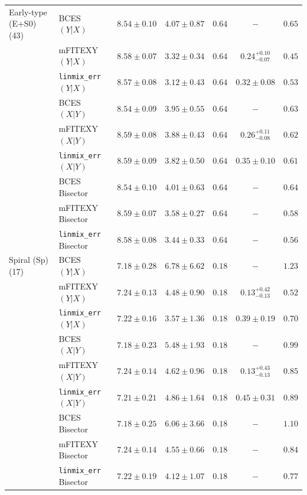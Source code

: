 \documentclass[preprint2]{emulateapj}
\begin{document}
\begin{table}
\begin{tabular}{llccccc}
 Early-type (E+S0) (43)	& BCES $(Y|X)$  	     & $8.54 \pm 0.10$ & $4.07 \pm 0.87$ & $0.64$ & $-$ & $0.65$ \\
 			& mFITEXY $(Y|X)$	     & $8.58 \pm 0.07$ & $3.32 \pm 0.34$ & $0.64$ & $0.24^{+0.10}_{-0.07}$ & $0.45$ \\
 			& {\tt linmix\_err} $(Y|X)$  & $8.57 \pm 0.08$ & $3.12 \pm 0.43$ & $0.64$ & $0.32 \pm 0.08$ & $0.53$ \\ [0.5em]
 			& BCES $(X|Y)$  	     & $8.54 \pm 0.09$ & $3.95 \pm 0.55$ & $0.64$ & $-$ & $0.63$ \\
 			& mFITEXY $(X|Y)$	     & $8.59 \pm 0.08$ & $3.88 \pm 0.43$ & $0.64$ & $0.26^{+0.11}_{-0.08}$ & $0.62$ \\
 			& {\tt linmix\_err} $(X|Y)$  & $8.59 \pm 0.09$ & $3.82 \pm 0.50$ & $0.64$ & $0.35 \pm 0.10$ & $0.61$ \\ [0.5em]
 			& BCES Bisector 	     & $8.54 \pm 0.10$ & $4.01 \pm 0.63$ & $0.64$ & $-$ & $0.64$ \\
 			& mFITEXY Bisector	     & $8.59 \pm 0.07$ & $3.58 \pm 0.27$ & $0.64$ & $-$ & $0.58$ \\
 			& {\tt linmix\_err} Bisector & $8.58 \pm 0.08$ & $3.44 \pm 0.33$ & $0.64$ & $-$ & $0.56$ \\ [0.5em]

 Spiral (Sp) (17)	& BCES $(Y|X)$  	     & $7.18 \pm 0.28$ & $6.78 \pm 6.62$ & $0.18$ & $-$ & $1.23$ \\
 			& mFITEXY $(Y|X)$	     & $7.24 \pm 0.13$ & $4.48 \pm 0.90$ & $0.18$ & $0.13^{+0.42}_{-0.13}$ & $0.52$ \\
 			& {\tt linmix\_err} $(Y|X)$  & $7.22 \pm 0.16$ & $3.57 \pm 1.36$ & $0.18$ & $0.39 \pm 0.19$ & $0.70$ \\ [0.5em]
 			& BCES $(X|Y)$  	     & $7.18 \pm 0.23$ & $5.48 \pm 1.93$ & $0.18$ & $-$ & $0.99$ \\
 			& mFITEXY $(X|Y)$	     & $7.24 \pm 0.14$ & $4.62 \pm 0.96$ & $0.18$ & $0.13^{+0.43}_{-0.13}$ & $0.85$ \\
 			& {\tt linmix\_err} $(X|Y)$  & $7.21 \pm 0.21$ & $4.86 \pm 1.64$ & $0.18$ & $0.45 \pm 0.31$ & $0.89$ \\ [0.5em]
 			& BCES Bisector 	     & $7.18 \pm 0.25$ & $6.06 \pm 3.66$ & $0.18$ & $-$ & $1.10$ \\
 			& mFITEXY Bisector	     & $7.24 \pm 0.14$ & $4.55 \pm 0.66$ & $0.18$ & $-$ & $0.84$ \\
 			& {\tt linmix\_err} Bisector & $7.22 \pm 0.19$ & $4.12 \pm 1.07$ & $0.18$ & $-$ & $0.77$ \\ [0.5em]


\end{tabular}
\end{table}
\end{document}
